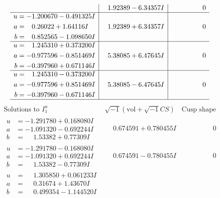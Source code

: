 \documentclass[1p]{elsarticle_modified}
\theoremstyle{definition}
\newcommand{\I}{\sqrt{-1}}
\begin{document}
$$\begin{array}{c|c|c}
 & \phantom{-}1.92389 - 6.34357 I & \phantom{-0.000000 } 0 \\ \hline\begin{aligned}
u &= -1.200670 - 0.491325 I \\
a &= \phantom{-}0.26022 + 1.64116 I \\
b &= \phantom{-}0.852565 - 1.098650 I\end{aligned}
 & \phantom{-}1.92389 + 6.34357 I & \phantom{-0.000000 } 0 \\ \hline\begin{aligned}
u &= \phantom{-}1.245310 + 0.373200 I \\
a &= -0.977596 - 0.851469 I \\
b &= -0.397960 + 0.671146 I\end{aligned}
 & \phantom{-}5.38085 + 6.47645 I & \phantom{-0.000000 } 0 \\ \hline\begin{aligned}
u &= \phantom{-}1.245310 - 0.373200 I \\
a &= -0.977596 + 0.851469 I \\
b &= -0.397960 - 0.671146 I\end{aligned}
 & \phantom{-}5.38085 - 6.47645 I & \phantom{-0.000000 } 0\\
 \hline 
 \end{array}$$\newpage$$\begin{array}{c|c|c}  
\text{Solutions to }I^u_{1}& \I (\text{vol} + \sqrt{-1}CS) & \text{Cusp shape}\\
 \hline 
\begin{aligned}
u &= -1.291780 + 0.168080 I \\
a &= -1.091320 - 0.692244 I \\
b &= \phantom{-}1.53382 + 0.77309 I\end{aligned}
 & \phantom{-}0.674591 + 0.780455 I & \phantom{-0.000000 } 0 \\ \hline\begin{aligned}
u &= -1.291780 - 0.168080 I \\
a &= -1.091320 + 0.692244 I \\
b &= \phantom{-}1.53382 - 0.77309 I\end{aligned}
 & \phantom{-}0.674591 - 0.780455 I & \phantom{-0.000000 } 0 \\ \hline\begin{aligned}
u &= \phantom{-}1.305850 + 0.061233 I \\
a &= \phantom{-}0.31674 + 1.43670 I \\
b &= \phantom{-}0.499354 - 1.144520 I\end{aligned}

\end{array}$$
\end{document}
